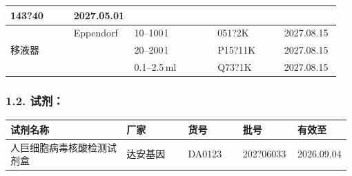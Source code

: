 \documentclass[UTF8,10pt,a4paper,fontset=fandol]{ctexart}
\newcommand{\fieldvalue}[1]{#1}
\newcommand{\handwritten}[1]{#1}
\begin{document}
\begin{tabular}{|p{0.19\linewidth}|p{0.14\linewidth}|p{0.25\linewidth}|p{0.20\linewidth}|p{0.17\linewidth}|}
\fieldvalue{\handwritten{143?40}} &
\fieldvalue{\handwritten{2027.05.01}}\\
\hline
\multirow{3}{*}{%
\fieldvalue{移液器}} &
\fieldvalue{Eppendorf} &
\fieldvalue{\handwritten{10--100\,\textmu l}} &
\fieldvalue{\handwritten{051?2K}} &
\fieldvalue{\handwritten{2027.08.15}}\\
\cline{3-5}
&
&
\fieldvalue{\handwritten{20--200\,\textmu l}} &
\fieldvalue{\handwritten{P15?11K}} &
\fieldvalue{\handwritten{2027.08.15}}\\
\cline{3-5}
&
&
\fieldvalue{\handwritten{0.1--2.5\,ml}} &
\fieldvalue{\handwritten{Q73?1K}} &
\fieldvalue{\handwritten{2027.08.15}}\\
\hline
\end{tabular}

\normalsize
\subsubsection*{1.2. 试剂：}

\begin{tabular}{|p{0.34\linewidth}|p{0.18\linewidth}|p{0.16\linewidth}|p{0.16\linewidth}|p{0.14\linewidth}|}
\hline
试剂名称 & 厂家 & 货号 & 批号 & 有效至\\
\hline
\fieldvalue{人巨细胞病毒核酸检测试剂盒} &
\fieldvalue{达安基因} &
\fieldvalue{DA0123} &
\fieldvalue{\handwritten{202?06033}} &
\fieldvalue{\handwritten{2026.09.04}}\\
\hline
\end{tabular}
\end{document}
